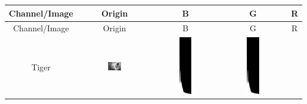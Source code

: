 \documentclass[12pt,a4paper]{article}
\begin{document}
\begin{center}
    \begin{longtable}{|c|c|c|c|c|}
    \hline
    Channel/Image & Origin & B & G & R \\
    \hline
    \endfirsthead
    
    \hline
    Channel/Image & Origin & B & G & R \\
    \hline
    \endhead
    
    Tiger & \includegraphics[width=0.2\textwidth]{./latexSource/tiger_process.png} & 
           \includegraphics[width=0.2\textwidth]{./latexSource/tiger_B_EQUA.png} & 
           \includegraphics[width=0.2\textwidth]{./latexSource/tiger_G_EQUA.png} & 

\end{longtable}
\end{center}
\end{document}
